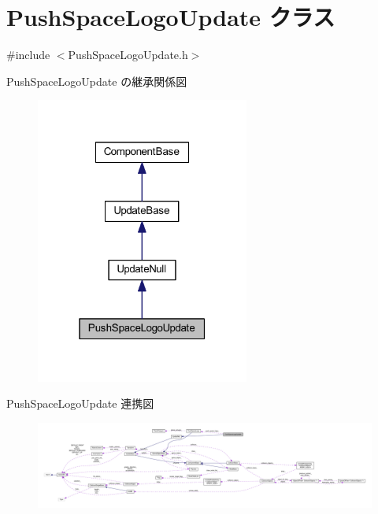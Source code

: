 \hypertarget{class_push_space_logo_update}{}\section{Push\+Space\+Logo\+Update クラス}
\label{class_push_space_logo_update}


{\ttfamily \#include $<$Push\+Space\+Logo\+Update.\+h$>$}



Push\+Space\+Logo\+Update の継承関係図\nopagebreak
\begin{figure}[H]
\begin{center}
\leavevmode
\includegraphics[width=199pt]{class_push_space_logo_update__inherit__graph}
\end{center}
\end{figure}


Push\+Space\+Logo\+Update 連携図\nopagebreak
\begin{figure}[H]
\begin{center}
\leavevmode
\includegraphics[width=350pt]{class_push_space_logo_update__coll__graph}
\end{center}
\end{figure}
